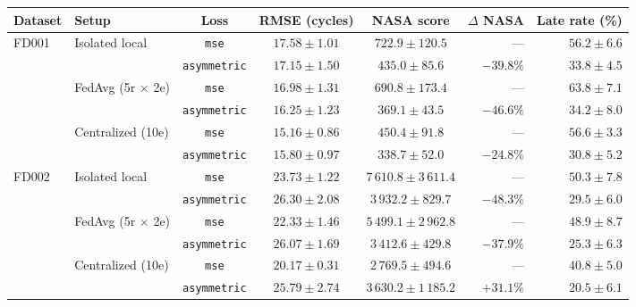 \begin{tabular}{llcccrr}\toprule
Dataset & Setup & Loss & RMSE (cycles) & NASA score & $\Delta$ NASA & Late rate (\%) \\\midrule
\multirow{6}{*}{FD001} & \multirow{2}{*}{Isolated local} & \texttt{mse} & $17.58\pm1.01$ & $722.9\pm120.5$ & --- & $56.2\pm6.6$ \\
 &  & \texttt{asymmetric} & \textbf{$17.15\pm1.50$} & \textbf{$435.0\pm85.6$} & $-39.8\%$ & \textbf{$33.8\pm4.5$} \\
\cmidrule(lr){2-7}
 & \multirow{2}{*}{FedAvg (5r $\times$ 2e)} & \texttt{mse} & $16.98\pm1.31$ & $690.8\pm173.4$ & --- & $63.8\pm7.1$ \\
 &  & \texttt{asymmetric} & \textbf{$16.25\pm1.23$} & \textbf{$369.1\pm43.5$} & $-46.6\%$ & \textbf{$34.2\pm8.0$} \\
\cmidrule(lr){2-7}
 & \multirow{2}{*}{Centralized (10e)} & \texttt{mse} & \textbf{$15.16\pm0.86$} & $450.4\pm91.8$ & --- & $56.6\pm3.3$ \\
 &  & \texttt{asymmetric} & $15.80\pm0.97$ & \textbf{$338.7\pm52.0$} & $-24.8\%$ & \textbf{$30.8\pm5.2$} \\
\midrule
\multirow{6}{*}{FD002} & \multirow{2}{*}{Isolated local} & \texttt{mse} & \textbf{$23.73\pm1.22$} & $7\,610.8\pm3\,611.4$ & --- & $50.3\pm7.8$ \\
 &  & \texttt{asymmetric} & $26.30\pm2.08$ & \textbf{$3\,932.2\pm829.7$} & $-48.3\%$ & \textbf{$29.5\pm6.0$} \\
\cmidrule(lr){2-7}
 & \multirow{2}{*}{FedAvg (5r $\times$ 2e)} & \texttt{mse} & \textbf{$22.33\pm1.46$} & $5\,499.1\pm2\,962.8$ & --- & $48.9\pm8.7$ \\
 &  & \texttt{asymmetric} & $26.07\pm1.69$ & \textbf{$3\,412.6\pm429.8$} & $-37.9\%$ & \textbf{$25.3\pm6.3$} \\
\cmidrule(lr){2-7}
 & \multirow{2}{*}{Centralized (10e)} & \texttt{mse} & \textbf{$20.17\pm0.31$} & \textbf{$2\,769.5\pm494.6$} & --- & $40.8\pm5.0$ \\
 &  & \texttt{asymmetric} & $25.79\pm2.74$ & $3\,630.2\pm1\,185.2$ & $+31.1\%$ & \textbf{$20.5\pm6.1$} \\
\bottomrule\end{tabular}

